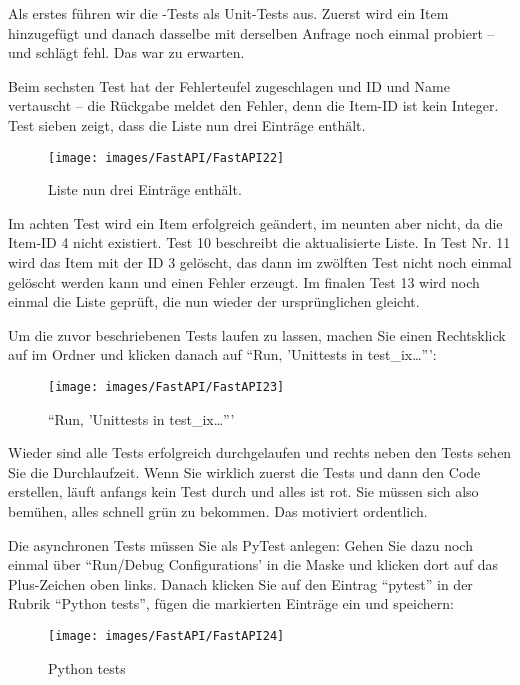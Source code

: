 Als erstes führen wir die -Tests als Unit-Tests aus. Zuerst wird ein Item hinzugefügt und danach dasselbe mit derselben Anfrage noch einmal probiert – und schlägt fehl. Das war zu erwarten.

Beim sechsten Test hat der Fehlerteufel zugeschlagen und ID und Name vertauscht -- die Rückgabe meldet den Fehler, denn die Item-ID ist kein Integer. Test sieben zeigt, dass die Liste nun drei Einträge enthält.

\begin{figure}
    \texttt{[image: images/FastAPI/FastAPI22]}
    \caption{Liste nun drei Einträge enthält.} \label{FastAPI22}
\end{figure}

Im achten Test wird ein Item erfolgreich geändert, im neunten aber nicht, da die Item-ID 4 nicht existiert. Test 10 beschreibt die aktualisierte Liste. In Test Nr. 11 wird das Item mit der ID 3 gelöscht, das dann im zwölften Test nicht noch einmal gelöscht werden kann und einen Fehler erzeugt. Im finalen Test 13 wird noch einmal die Liste geprüft, die nun wieder der ursprünglichen gleicht.

Um die zuvor beschriebenen Tests laufen zu lassen, machen Sie einen Rechtsklick auf  im Ordner  und klicken danach auf ``Run‚ 'Unittests in test\_ix\ldots''':

\begin{figure}
    \texttt{[image: images/FastAPI/FastAPI23]}
    \caption{``Run‚ 'Unittests in test\_ix\ldots'''} \label{FastAPI23}
\end{figure}


Wieder sind alle Tests erfolgreich durchgelaufen und rechts neben den Tests sehen Sie die Durchlaufzeit. Wenn Sie wirklich zuerst die Tests und dann den Code erstellen, läuft anfangs kein Test durch und alles ist rot. Sie müssen sich also bemühen, alles schnell grün zu bekommen. Das motiviert ordentlich.

Die asynchronen Tests müssen Sie als PyTest anlegen: Gehen Sie dazu noch einmal über ``Run/Debug Configurations' in die Maske und klicken dort auf das Plus-Zeichen oben links. Danach klicken Sie auf den Eintrag ``pytest'' in der Rubrik ``Python tests'', fügen die markierten Einträge ein und speichern:

\begin{figure}
    \texttt{[image: images/FastAPI/FastAPI24]}
    \caption{Python tests} \label{FastAPI24}
\end{figure}


